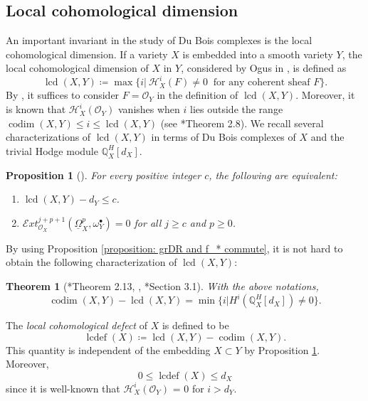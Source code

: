 \documentclass[11pt]{amsart}
\newtheorem{theorem}[equation]{Theorem}
\newtheorem{proposition}[equation]{Proposition}
\theoremstyle{definition}
\theoremstyle{plain}
\newcommand{\E}{\mathcal E}
\renewcommand{\H}{\mathcal H}
\renewcommand{\O}{\mathcal O}
\newcommand{\QQ}{\mathbb Q}
\newcommand{\sExt}{\E xt} %
\newcommand{\DB}{\underline{\Omega}} %
\DeclareMathOperator{\lcd}{lcd}
\DeclareMathOperator{\codim}{codim}
\DeclareMathOperator{\lcdef}{lcdef}
\begin{document}
\subsection{Local cohomological dimension}

An important invariant in the study of Du Bois complexes is the local cohomological dimension. If a variety $X$ is embedded into a smooth variety $Y$, the local cohomological dimension of $X$ in $Y$, considered by Ogus in \cite{Ogus-lcd}, is defined as 
\begin{equation} \label{definition: lcdef}
    \lcd(X,Y) \coloneqq \max\{i|\  \H^i_X(F) \neq 0\ \text{ for any coherent sheaf $F$}\}.
\end{equation}
By \cite[Proposition 2.1]{Ogus-lcd}, it suffices to consider $F=\O_Y$ in the definition of $\lcd(X,Y)$. Moreover, it is known that $\H^i_X(\O_Y)$ vanishes when $i$ lies outside the range $\codim(X,Y)\le i \le \lcd(X,Y)$ (see \cite{Ogus-lcd}*{Theorem 2.8}). We recall several characterizations of $\lcd(X,Y)$ in terms of Du Bois complexes of $X$ and the trivial Hodge module $\QQ^H_X[d_X]$. 

\begin{proposition}[{\cite[Corollary 12.6]{MP-lci}}] \label{proposition: lcd and DB}
    For every positive integer $c$, the following are equivalent:
    \begin{enumerate}
        \item $\lcd(X,Y) -d_Y \le c$.
        \item $\sExt^{j+p+1}_{\O_X}(\DB^p_X, \omega_Y^{\bullet})=0$ for all $j\ge c$ and $p\ge 0$.
    \end{enumerate}
\end{proposition}

By using Proposition \ref{proposition: grDR and f_* commute}, it is not hard to obtain the following characterization of $\lcd(X,Y)$:

\begin{theorem}[{\cite{Ogus-lcd}*{Theorem 2.13}, \cite[Theorem 1]{saito-lcd}, \cite{Bhatt}*{Section 3.1}}] \label{theorem: cohom range of Q_X} With the above notations, 
\[\codim(X,Y)-\lcd(X,Y) = \min\{i|H^i(\QQ^H_X[d_X])\neq 0\}.\] 
\end{theorem}

The \textit{local cohomological defect} of $X$ is defined to be
\[\lcdef(X) \coloneqq \lcd(X,Y) - \codim(X,Y).\]
This quantity is independent of the embedding $X\subset Y$ by Proposition \ref{proposition: lcd and DB}. Moreover,
\[0\le \lcdef(X)\le d_X\] 
since it is well-known that $\H^i_X(\O_Y)$ = 0 for $i > d_Y$. 
\end{document}
